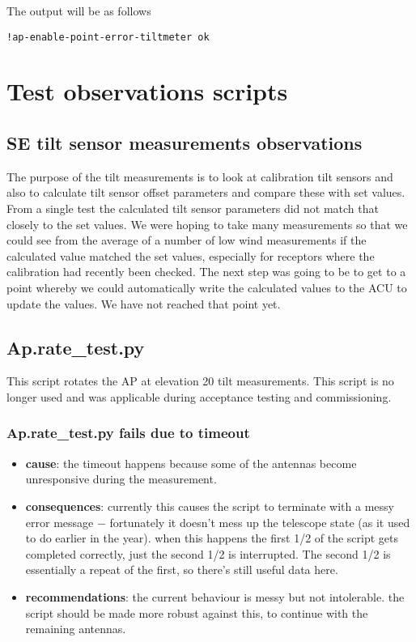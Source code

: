 The output will be as follows
\begin{lstlisting}[style=DOS]
!ap-enable-point-error-tiltmeter ok
\end{lstlisting}


 
\section{ Test observations scripts} 
\subsection{SE tilt sensor measurements observations} 
The purpose of the tilt measurements is to look at calibration tilt sensors and also to calculate tilt sensor offset parameters and compare these with set values. From a single test the calculated tilt sensor parameters did not match that closely to the set values. We were hoping to take many measurements so that we could see from the average of a number of low wind measurements if the calculated value matched the set values, especially for receptors where the calibration had recently been checked.   The next step was going to be to get to a point whereby we could automatically write the calculated values to the ACU to update the values. We have not reached that point yet.


\subsection{ Ap.rate\_test.py}

This script rotates the AP at elevation 20 tilt measurements. This script is no longer used and was applicable during acceptance testing and commissioning.
\subsubsection{ Ap.rate\_test.py fails due to timeout}
\begin{itemize}
	\item[] \textbf{cause}: the timeout happens because some of the antennas become unresponsive during the measurement.
	\item[] \textbf{consequences}:  currently this causes the script to terminate with a messy error message $-$ fortunately it doesn’t mess up the telescope state (as it used to do earlier in the year). when this happens the first 1/2 of the script gets completed correctly, just the second 1/2 is interrupted. The second 1/2 is essentially a repeat of the first, so there’s still useful data here.
	\item[] \textbf{recommendations}: the current behaviour is messy but not intolerable.  the script should be made more robust against this, to continue with the remaining antennas.
		
\end{itemize}







